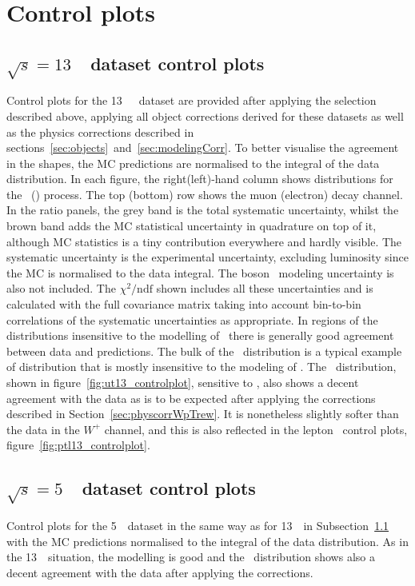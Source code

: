 
\chapter{Control plots}

\section{$\sqrt{s} = 13$~\TeV\ dataset control plots}
\label{subsec:controlplots13}


Control plots for the 13~\TeV\ \lowmu\ dataset are provided after applying the selection described above, applying all object corrections derived for these datasets as well as the physics corrections described in sections~\ref{sec:objects}~and~\ref{sec:modelingCorr}. To better visualise the agreement in the shapes, the MC predictions are normalised to the integral of the data distribution. In each figure, the right(left)-hand column shows distributions for the \Wplus\ (\Wminus) process. The top (bottom) row shows the muon (electron) decay channel. In the ratio panels, the grey band is the total systematic uncertainty, whilst the brown band adds the MC statistical uncertainty in quadrature on top of it, although MC statistics is a tiny contribution everywhere and hardly visible. The systematic uncertainty is the experimental uncertainty, excluding luminosity since the MC is normalised to the data integral. The boson \pt\ modeling uncertainty is also not included. The $\chi^2/\mathrm{ndf}$ shown includes all these uncertainties and is calculated with the full covariance matrix taking into account bin-to-bin correlations of the systematic uncertainties as appropriate.
In regions of the distributions insensitive to the modelling of \ptw\ there is generally good agreement between data and predictions. The bulk of the \mt\ distribution is a typical example of distribution that is mostly insensitive to the modeling of \ptw.
The \ut\ distribution, shown in figure~\ref{fig:ut13_controlplot}, sensitive to \ptw, also shows a decent agreement with the data as is to be expected after
applying the corrections described in Section~\ref{sec:physcorrWpTrew}. It is nonetheless slightly softer than the data in the $W^+$ channel, and this is also reflected in the lepton \pt\
control plots, figure~\ref{fig:ptl13_controlplot}.

\section{$\sqrt{s} = 5$~\TeV\ dataset control plots}
\label{subsec:controlplots5}

Control plots for the 5~\TeV\ dataset in the same way as for 13~\TeV\ in Subsection~\ref{subsec:controlplots13} with the MC predictions normalised to the integral of the data distribution. As in the 13~\TeV\ situation, the modelling is good and the \ut\ distribution shows also a decent agreement with the data after applying the corrections.

